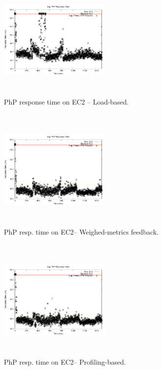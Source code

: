 \begin{figure}
\begin{center}
\includegraphics[width=0.49\textwidth, height=6cm]{./images/heterogeneous/avgTimeout_PhP_naive}
\end{center}
\caption{PhP  response time on EC2 -- Load-based.}
\label{naiveEC2}
\end{figure}


\begin{figure}
\begin{center}
\includegraphics[width=0.49\textwidth, height=6cm]{./images/heterogeneous/avgTimeout_PhP_history}
\end{center}
\caption{PhP resp. time on EC2-- Weighed-metrics feedback.}
\label{historyEC2}
\end{figure}

\begin{figure}
\begin{center}
\includegraphics[width=0.49\textwidth, height=6cm]{./images/heterogeneous/avgTimeout_PhP_weightHistory}
\end{center}
\caption{ PhP resp. time on EC2-- Profiling-based.}
\label{historyWeightEC2}
\end{figure}

